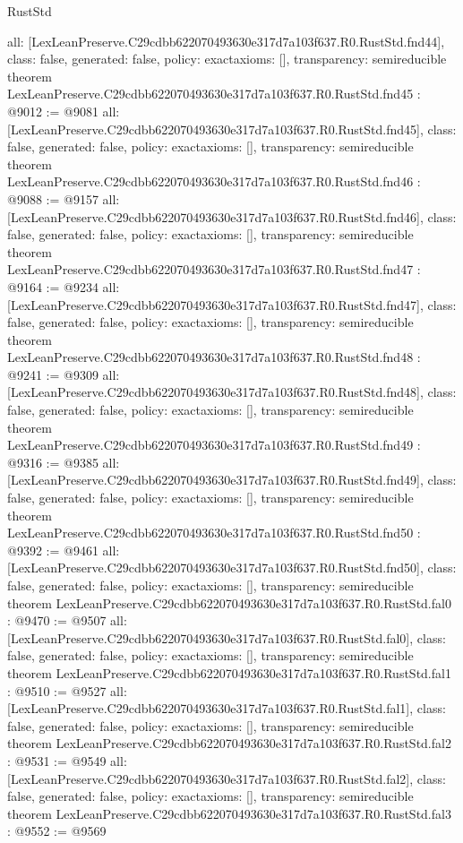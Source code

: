 \begin{lexlean}{RustStd}
\begin{coremodule}
{  all: [LexLeanPreserve.C29cdbb622070493630e317d7a103f637.R0.RustStd.fnd44],
  class: false,
  generated: false,
  policy: exact{axioms: []},
  transparency: semireducible
}
theorem LexLeanPreserve.C29cdbb622070493630e317d7a103f637.R0.RustStd.fnd45 : @9012 := @9081 {
  all: [LexLeanPreserve.C29cdbb622070493630e317d7a103f637.R0.RustStd.fnd45],
  class: false,
  generated: false,
  policy: exact{axioms: []},
  transparency: semireducible
}
theorem LexLeanPreserve.C29cdbb622070493630e317d7a103f637.R0.RustStd.fnd46 : @9088 := @9157 {
  all: [LexLeanPreserve.C29cdbb622070493630e317d7a103f637.R0.RustStd.fnd46],
  class: false,
  generated: false,
  policy: exact{axioms: []},
  transparency: semireducible
}
theorem LexLeanPreserve.C29cdbb622070493630e317d7a103f637.R0.RustStd.fnd47 : @9164 := @9234 {
  all: [LexLeanPreserve.C29cdbb622070493630e317d7a103f637.R0.RustStd.fnd47],
  class: false,
  generated: false,
  policy: exact{axioms: []},
  transparency: semireducible
}
theorem LexLeanPreserve.C29cdbb622070493630e317d7a103f637.R0.RustStd.fnd48 : @9241 := @9309 {
  all: [LexLeanPreserve.C29cdbb622070493630e317d7a103f637.R0.RustStd.fnd48],
  class: false,
  generated: false,
  policy: exact{axioms: []},
  transparency: semireducible
}
theorem LexLeanPreserve.C29cdbb622070493630e317d7a103f637.R0.RustStd.fnd49 : @9316 := @9385 {
  all: [LexLeanPreserve.C29cdbb622070493630e317d7a103f637.R0.RustStd.fnd49],
  class: false,
  generated: false,
  policy: exact{axioms: []},
  transparency: semireducible
}
theorem LexLeanPreserve.C29cdbb622070493630e317d7a103f637.R0.RustStd.fnd50 : @9392 := @9461 {
  all: [LexLeanPreserve.C29cdbb622070493630e317d7a103f637.R0.RustStd.fnd50],
  class: false,
  generated: false,
  policy: exact{axioms: []},
  transparency: semireducible
}
theorem LexLeanPreserve.C29cdbb622070493630e317d7a103f637.R0.RustStd.fal0 : @9470 := @9507 {
  all: [LexLeanPreserve.C29cdbb622070493630e317d7a103f637.R0.RustStd.fal0],
  class: false,
  generated: false,
  policy: exact{axioms: []},
  transparency: semireducible
}
theorem LexLeanPreserve.C29cdbb622070493630e317d7a103f637.R0.RustStd.fal1 : @9510 := @9527 {
  all: [LexLeanPreserve.C29cdbb622070493630e317d7a103f637.R0.RustStd.fal1],
  class: false,
  generated: false,
  policy: exact{axioms: []},
  transparency: semireducible
}
theorem LexLeanPreserve.C29cdbb622070493630e317d7a103f637.R0.RustStd.fal2 : @9531 := @9549 {
  all: [LexLeanPreserve.C29cdbb622070493630e317d7a103f637.R0.RustStd.fal2],
  class: false,
  generated: false,
  policy: exact{axioms: []},
  transparency: semireducible
}
theorem LexLeanPreserve.C29cdbb622070493630e317d7a103f637.R0.RustStd.fal3 : @9552 := @9569 {
}
\end{coremodule}
\end{lexlean}
